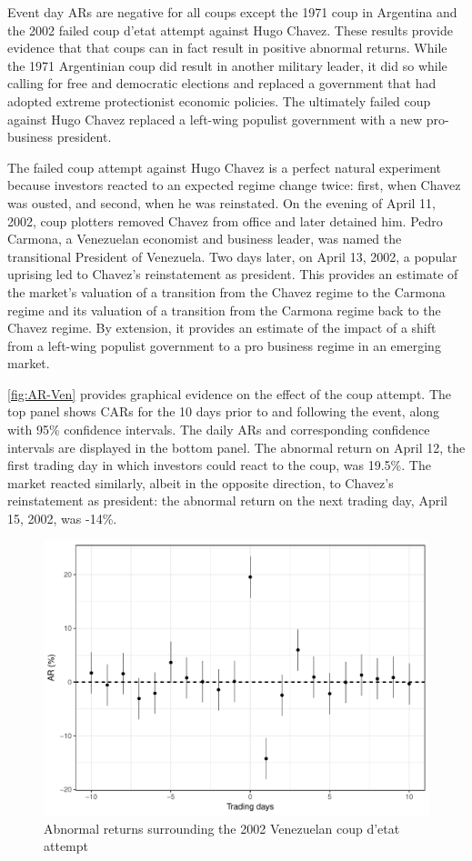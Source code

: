 \documentclass[12pt,final,fleqn]{article}
\theoremstyle{plain}
\begin{document}
Event day ARs are negative for all coups except the 1971 coup in Argentina and the 2002 failed coup d'etat attempt against Hugo Chavez. These results provide evidence that that coups can in fact result in positive abnormal returns. While the 1971 Argentinian coup did result in another military leader, it did so while calling for free and democratic elections and replaced a government that had adopted extreme protectionist economic policies. The ultimately failed coup against Hugo Chavez replaced a left-wing populist government with a new pro-business president.

The failed coup attempt against Hugo Chavez is a perfect natural experiment because investors reacted to an expected regime change twice: first, when Chavez was ousted, and second, when he was reinstated. On the evening of April 11, 2002, coup plotters removed Chavez from office and later detained him. Pedro Carmona, a Venezuelan economist and business leader, was named the transitional President of Venezuela. Two days later, on April 13, 2002, a popular uprising led to Chavez's reinstatement as president. This provides an estimate of the market's valuation of a transition from the Chavez regime to the Carmona regime and its valuation of a transition from the Carmona regime back to the Chavez regime. By extension, it provides an estimate of the impact of a shift from a left-wing populist government to a pro business regime in an emerging market.

\autoref{fig:AR-Ven} provides graphical evidence on the effect of the coup attempt. The top panel shows CARs for the 10 days prior to and following the event, along with 95\% confidence intervals. The daily ARs and corresponding confidence intervals are displayed in the bottom panel. The abnormal return on April 12, the first trading day in which investors could react to the coup, was 19.5\%. The market reacted similarly, albeit in the opposite direction, to Chavez's reinstatement as president: the abnormal return on the next trading day, April 15, 2002, was -14\%.

\begin{figure}[!ht]
\includegraphics{../figs/venezuela_coup_attempt_2002.pdf}
\caption{Abnormal returns surrounding the 2002 Venezuelan coup d'etat attempt}
\label{fig:AR-Ven}
\end{figure}
\end{document}
